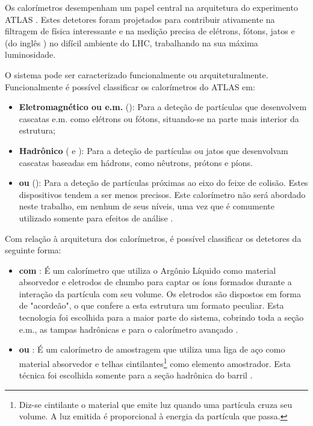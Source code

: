 Os calorímetros desempenham um papel central na arquitetura do experimento
ATLAS \cite{atlas-calo-tpr}. Estes detetores foram projetados para contribuir
ativamente na filtragem de física interessante e na medição precisa de
elétrons, fótons, jatos e  (do inglês
) no difícil ambiente do LHC, trabalhando na sua
máxima luminosidade.

O sistema pode ser caracterizado funcionalmente ou
arquiteturalmente. Funcionalmente é possível classificar os calorímetros do
ATLAS em:

\begin{itemize}
\item \textbf{Eletromagnético ou e.m.} (): Para
a deteção de partículas que desenvolvem cascatas e.m. como elétrons ou fótons,
situando-se na parte mais interior da estrutura;

\item \textbf{Hadrônico} ( e ): Para a deteção de partículas ou jatos que desenvolvam
cascatas baseadas em hádrons, como nêutrons, prótons e píons.

\item \textbf{ ou } (): Para a deteção de partículas próximas ao eixo do feixe de
colisão. Estes dispositivos tendem a ser menos precisos. Este calorímetro não
será abordado neste trabalho, em nenhum de seus níveis, uma vez que é
comumente utilizado somente para efeitos de análise
.
\end{itemize}

Com relação à arquitetura dos calorímetros, é possível classificar os
detetores da seguinte forma:

\begin{itemize}
\item \textbf{ com }: É um
calorímetro que utiliza o Argônio Líquido como material absorvedor e eletrodos
de chumbo para captar os íons formados durante a interação da partícula com
seu volume. Os eletrodos são dispostos em forma de "acordeão", o que confere a
esta estrutura um formato peculiar. Esta tecnologia foi escolhida para a maior
parte do sistema, cobrindo toda a seção e.m., as tampas hadrônicas e para o
calorímetro avançado \cite{lar-tdr}.

\item \textbf{ ou }: É um
calorímetro de amostragem que utiliza uma liga de aço como material absorvedor
e telhas cintilantes\footnote{Diz-se cintilante o material que emite luz
quando uma partícula cruza seu volume. A luz emitida é proporcional à energia
da partícula que passa.} como elemento amostrador. Esta técnica foi escolhida
somente para a seção hadrônica do barril \cite{tilecal}.
\end{itemize}

